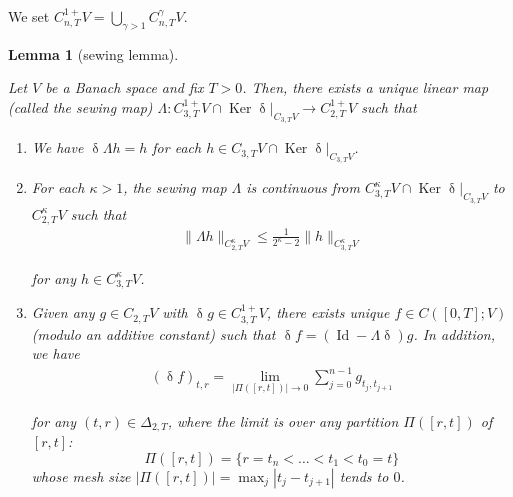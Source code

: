 \documentclass[letterpaper, 11pt,  reqno]{amsart}
\newtheorem{lemma}[theorem]{Lemma}
\DeclareMathOperator{\Id}{Id}
\DeclareMathOperator{\Ker}{Ker}
\newcommand{\1}{\hspace{0.5mm}\textup{I}\hspace{0.5mm}}
\newcommand{\noi}{\noindent}
\newcommand{\updl}{\updelta}
\newcommand{\Dl}{\Delta}
\newcommand{\kk}{\kappa}
\newcommand{\g}{\gamma}
\numberwithin{equation}{section}
\numberwithin{theorem}{section}
\begin{document}
We set 
$C^{1+}_{n,T}V = \bigcup_{\g>1}C^\g_{n,T}V$.

\begin{lemma}[sewing lemma]
\label{LEM:sew}


Let $V$ be a Banach space and 
fix $T>0$. 
Then,  there exists a unique linear map \textup{(}called the sewing map\textup{)}
$\Lambda:C^{1+}_{3,T} V \cap 
\Ker \updl|_{C_{3,T}V}
\to C^{1+}_{2,T}V$ such that 

\smallskip
\begin{enumerate}
\item[(i)] 
We have 
$\updl \Lambda h = h$
for each  $h\in C_{3,T}V\cap \Ker  \updl|_{C_{3,T} V}$.



\smallskip

\item[(ii)]
 For each $\kk >1$,
the sewing map $\Lambda$ is continuous
from $C^\kk _{3,T}V\cap 
\Ker  \updl|_{C_{3,T} V}$ to 
$C^\kk _{2,T}V$ such that 
\begin{align}
\|\Lambda h \|_{C^\kk _{2,T}V} 
\le \frac{1}{2^\kk - 2}  \| h \|_{C^\kk _{3,T}V} 
\label{sew1}
\end{align}


\noi
for any $h\in C^\kk _{3,T}V$.



\smallskip
\item[(iii)] 
Given any  $g\in C_{2,T}V$ 
with 
$\updl g\in C^{1+} _{3,T}V$, 
 there exists  unique
$f\in C([0, T];V)$  \textup{(}modulo an additive  constant\textup{)} 
such that 
$\updl f = (\Id - \Lambda \updl)g$. 
In addition, 
we have 
\begin{align*}
(\updl f)_{t,r} = \lim_{|\Pi([r,t])|\to 0} 
\sum_{j=0}^{n-1} g_{t_j,t_{j+1}}
\end{align*}


\noi
 for any $(t,r)\in \Dl_{2,T}$,
 where 
 the limit is over any partition
 $\Pi([r,t])$  
 of  $[r,t]$\textup{:} 
\[\Pi ([r,t]) = \{r = t_n < \dots < t_1 <  t_0 = t\}\]
whose mesh size 
$|\Pi([r,t])| = \max_{j} |t_j-t_{j+1}|$ 
tends to $0$.


\end{enumerate}


\end{lemma}
\end{document}
